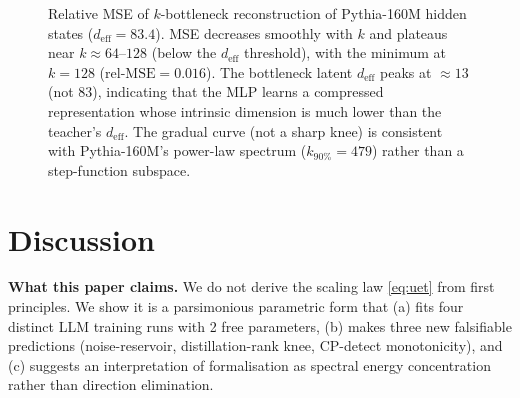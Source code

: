 \documentclass[10pt]{article}
\newcommand{\deff}{d_{\mathrm{eff}}}
\theoremstyle{plain}
\theoremstyle{definition}
\theoremstyle{remark}
\begin{document}
\begin{figure}[H]
\centering
{}
\caption{Relative MSE of $k$-bottleneck reconstruction of Pythia-160M hidden
states ($\deff = 83.4$).
MSE decreases smoothly with $k$ and plateaus near $k \approx 64$--$128$ (below
the $\deff$ threshold), with the minimum at $k=128$ ($\text{rel-MSE} = 0.016$).
The bottleneck latent $\deff$ peaks at $\approx 13$ (not 83), indicating
that the MLP learns a compressed representation whose intrinsic dimension is
much lower than the teacher's $\deff$.
The gradual curve (not a sharp knee) is consistent with Pythia-160M's
power-law spectrum ($k_{90\%} = 479$) rather than a step-function subspace.}
\label{fig:distill}
\end{figure}

\section{Discussion}
\label{sec:discussion}

\textbf{What this paper claims.}
We do not derive the scaling law \eqref{eq:uet} from first principles.
We show it is a parsimonious parametric form that (a) fits four distinct
LLM training runs with 2 free parameters, (b) makes three new falsifiable
predictions (noise-reservoir, distillation-rank knee, CP-detect monotonicity),
and (c) suggests an interpretation of formalisation as spectral energy
concentration rather than direction elimination.
\end{document}
